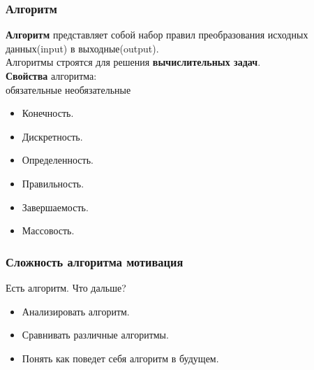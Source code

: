 \documentclass[russian, 12pt]{beamer}
\begin{document}
\begin{frame}
\frametitle{Алгоритм}
\textbf{Алгоритм} представляет собой набор правил преобразования исходных данных(input) 
в выходные(output).\\[0.2cm]
\pause
Алгоритмы строятся для решения \textbf{вычислительных задач}.\\[0.2cm]
\pause
\textbf{Свойства} алгоритма:\\[0.2cm]
обязательные \hspace{3cm} необязательные
\begin{multicols}{2}
\begin{itemize}
  \item<4-> [1] Конечность.\\[0.3cm]

  \item<5-> [2] Дискретность.\\[0.3cm]

  \item<6-> [3] Определенность.\\[0.3cm]
  
  \item<7-> [4] Правильность. \\[0.3cm]
  
  \item<8-> [5] Завершаемость. \\[0.3cm]
  
  \item<9-> [6] Массовость. \\

\end{itemize}
\end{multicols}
\end{frame}
\begin{frame}
  \frametitle{Сложность алгоритма мотивация}
  Есть алгоритм. Что дальше?\\[0.3cm]
  \pause
  \begin{itemize}

    \item Анализировать алгоритм.\\[0.5cm]
    \pause
    \item Сравнивать различные алгоритмы.\\[0.5cm]
    \pause
    \item Понять как поведет себя алгоритм в будущем.\\[0.5cm]
    
  \end{itemize}
  
  \end{frame}
\end{document}
